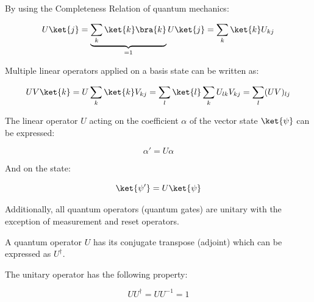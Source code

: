 \documentclass{article}
\begin{document}
\noindent
By using the Completeness Relation of quantum mechanics:
\vspace{5mm}

\begin{equation}
U\ket{j} = \underbrace{\sum\limits_k\ket{k}\bra{k}}_{ = 1} U\ket{j} = \sum\limits_k \ket{k} U_{kj}    
\end{equation}
\vspace{5mm}

\noindent
Multiple linear operators applied on a basis state can be written as:
\vspace{5mm}

\begin{equation}
UV\ket{k} = U\sum\limits_k \ket{k}V_{kj} = \sum\limits_l\ket{l} \sum\limits_k U_{lk} V_{kj} = \sum\limits_l(UV)_{lj}
\end{equation}
\vspace{5mm}

\noindent
The linear operator $U$ acting on the coefficient $\alpha$ of the vector state $\ket{\psi}$ can be expressed:
\vspace{5mm}

\begin{equation}
\alpha' = U\alpha
\end{equation}
\vspace{5mm}

\noindent
And on the state:
\vspace{5mm}

\begin{equation}
\ket{\psi'} = U\ket{\psi}
\end{equation}
\vspace{5mm}

\noindent
Additionally, all quantum operators (quantum gates) are unitary with the exception of measurement and reset operators. 
\vspace{5mm}

\noindent
A quantum operator $U$ has its conjugate transpose (adjoint) which can be expressed as $U^{\dagger}$.
\vspace{5mm}

\noindent
The unitary operator has the following property\cite{noauthor_unitary_2022}:
\vspace{5mm}

\begin{equation}
UU^{\dagger} = UU^{-1} = 1    
\end{equation}
\vspace{5mm}
\end{document}
